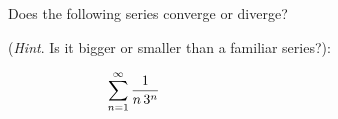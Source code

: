 Does the following series converge or diverge?

\noindent (\emph{Hint}. Is it bigger or smaller than a familiar series?):

\medskip
  $$\sum_{n=1}^\infty \frac{1}{n\, 3^n} \hspace{2.5in}$$